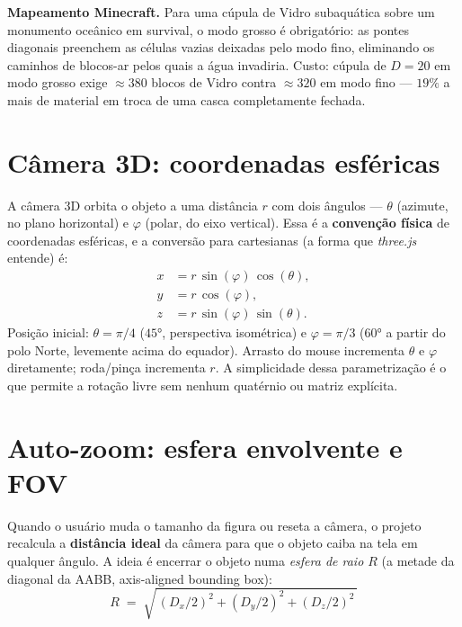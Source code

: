 \documentclass[12pt,a4paper]{scrartcl}
\newcommand{\acc}[1]{\textcolor{accent}{\textbf{#1}}}
\begin{document}
\begin{minec}
\textbf{Mapeamento Minecraft.} Para uma cúpula de Vidro subaquática sobre um monumento oceânico em survival, o modo grosso é obrigatório: as pontes diagonais preenchem as células vazias deixadas pelo modo fino, eliminando os caminhos de blocos-ar pelos quais a água invadiria. Custo: cúpula de $D=20$ em modo grosso exige $\approx 380$ blocos de Vidro contra $\approx 320$ em modo fino --- $19\%$ a mais de material em troca de uma casca completamente fechada.
\end{minec}

\section{Câmera 3D: coordenadas esféricas}

A câmera 3D orbita o objeto a uma distância $r$ com dois ângulos --- $\theta$ (azimute, no plano horizontal) e $\varphi$ (polar, do eixo vertical). Essa é a \acc{convenção física} de coordenadas esféricas, e a conversão para cartesianas (a forma que \emph{three.js} entende) é:
\[
\begin{aligned}
x &= r\,\sin(\varphi)\,\cos(\theta), \\
y &= r\,\cos(\varphi), \\
z &= r\,\sin(\varphi)\,\sin(\theta).
\end{aligned}
\]
Posição inicial: $\theta = \pi/4$ ($45°$, perspectiva isométrica) e $\varphi = \pi/3$ ($60°$ a partir do polo Norte, levemente acima do equador). Arrasto do mouse incrementa $\theta$ e $\varphi$ diretamente; roda/pinça incrementa $r$. A simplicidade dessa parametrização é o que permite a rotação livre sem nenhum quatérnio ou matriz explícita.

\section{Auto-zoom: esfera envolvente e FOV}

Quando o usuário muda o tamanho da figura ou reseta a câmera, o projeto recalcula a \acc{distância ideal} da câmera para que o objeto caiba na tela em qualquer ângulo. A ideia é encerrar o objeto numa \emph{esfera de raio $R$} (a metade da diagonal da AABB, axis-aligned bounding box):
\[
R \;=\; \sqrt{\,(D_x/2)^2 + (D_y/2)^2 + (D_z/2)^2\,}
\]
\end{document}
